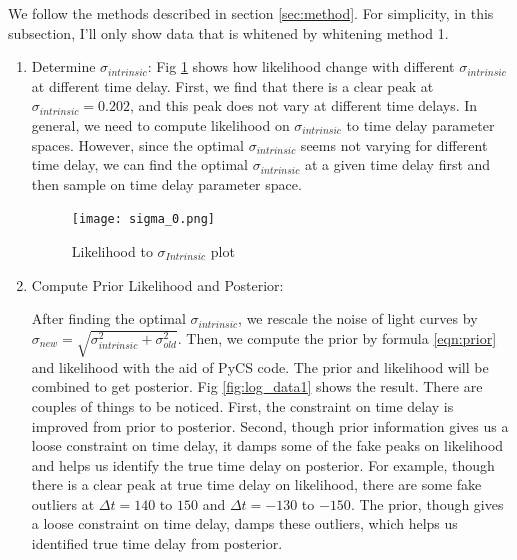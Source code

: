 \documentclass[\docopts]{\docclass}
\begin{document}
We follow the methods described in section \ref{sec:method}.  For simplicity, in this subsection, I'll only show data that is whitened by whitening method 1.
\begin{enumerate}
\item Determine $\sigma_{intrinsic}$:
Fig \ref{fig:sigma1} shows how likelihood change with different $\sigma_{intrinsic}$ at different time delay. First, we find that there is a clear peak at $\sigma_{intrinsic}=0.202$, and this peak does not vary at different time delays. In general, we need to compute likelihood on $\sigma_{intrinsic}$ to time delay parameter spaces. However, since the optimal $\sigma_{intrinsic}$ seems not varying for different time delay, we can find the optimal $\sigma_{intrinsic}$ at a given time delay first and then sample on time delay parameter space.

\begin{figure}[!h]
\texttt{[image: sigma\_0.png]}
\caption{Likelihood to $\sigma_{Intrinsic}$ plot}
\label{fig:sigma1}
\end{figure}

\item Compute Prior Likelihood and Posterior:

After finding the optimal $\sigma_{intrinsic}$, we rescale the noise of light curves by $\sigma_{new}=\sqrt{\sigma_{intrinsic}^2+\sigma_{old}^2}$. Then, we compute the prior by formula \ref{eqn:prior} and likelihood with the aid of PyCS code. The prior and likelihood will be combined to get posterior. Fig \ref{fig:log_data1} shows the result.  There are couples of things to be noticed. First, the constraint on time delay is improved from prior to posterior. Second, though prior information gives us a loose constraint on time delay, it damps some of the fake peaks on likelihood and helps us identify the true time delay on posterior. For example, though there is a clear peak at true time  delay on likelihood, there are some fake outliers at  $\Delta t =140$ to $150$ and $\Delta t =-130$ to $-150$. The prior, though gives a loose constraint on time delay, damps these outliers, which helps us identified true time delay from posterior.


\end{enumerate}
\end{document}

